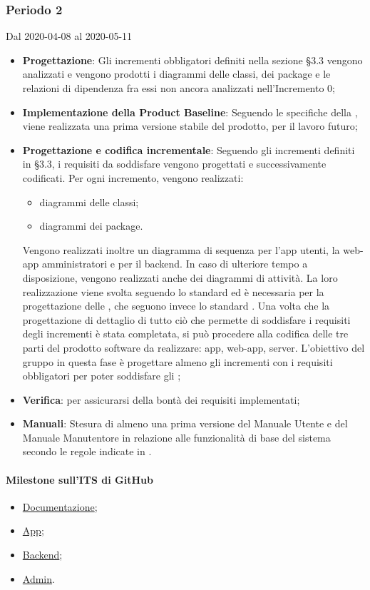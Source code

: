 \subsubsection{Periodo 2} 
Dal 2020-04-08 al 2020-05-11
\begin{itemize}
	\item \textbf{Progettazione}: Gli incrementi obbligatori definiti nella sezione §3.3 vengono analizzati e vengono prodotti i diagrammi delle classi, dei package e le relazioni di dipendenza fra essi non ancora analizzati nell'Incremento 0;
	\item \textbf{Implementazione della Product Baseline}: Seguendo le specifiche della , viene realizzata una prima versione stabile del prodotto,  per il lavoro futuro;
	\item \textbf{Progettazione e codifica incrementale}: Seguendo gli incrementi definiti in §3.3, i requisiti da soddisfare vengono progettati e successivamente codificati. Per ogni incremento, vengono realizzati:
	\begin{itemize}
		\item diagrammi delle classi;
		\item diagrammi dei package.
	\end{itemize}
	Vengono realizzati inoltre un diagramma di sequenza per l'app utenti, la web-app amministratori e per il backend. In caso di ulteriore tempo a disposizione, vengono realizzati anche dei diagrammi di attività.
	La loro realizzazione viene svolta seguendo lo standard  ed è necessaria per la progettazione delle , che seguono invece lo standard .
	Una volta che la progettazione di dettaglio di tutto ciò che permette di soddisfare i requisiti degli incrementi è stata completata, si può procedere alla codifica delle tre parti del prodotto software da realizzare: app, web-app, server.
	L'obiettivo del gruppo in questa fase è progettare almeno gli incrementi con i requisiti obbligatori per poter soddisfare gli ;
	\item \textbf{Verifica}:  per assicurarsi della bontà dei requisiti implementati;
	\item \textbf{Manuali}: Stesura di almeno una prima versione del Manuale Utente e del Manuale Manutentore in relazione alle funzionalità di base del sistema secondo le regole indicate in \NdP{}.
\end{itemize}
\paragraph{Milestone sull'ITS di GitHub}
\begin{itemize}
	\item \href{https://github.com/qb-team/Stalker-Documentazione/milestone/12}{Documentazione};
	\item \href{https://github.com/qb-team/Stalker-App/milestone/2}{App};
	\item \href{https://github.com/qb-team/Stalker-Backend/milestone/2}{Backend};
	\item \href{https://github.com/qb-team/Stalker-Admin/milestone/2}{Admin}.
\end{itemize}

